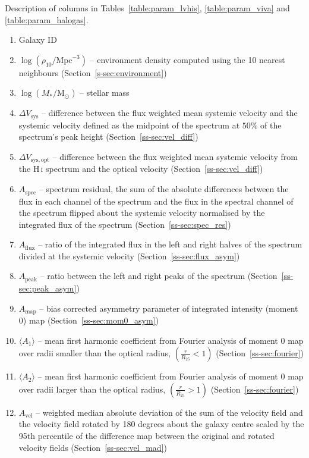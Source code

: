 \documentclass[fleqn,usenatbib]{mnras}
\begin{document}
Description of columns in Tables~\ref{table:param_lvhis}, \ref{table:param_viva} and \ref{table:param_halogas}.

\renewcommand{\labelenumi}{\arabic{enumi}}
\begin{enumerate}
    \item Galaxy ID
    \item $\log(\rho_{10}/\mathrm{Mpc}^{-3})$ -- environment density computed using the 10 nearest neighbours (Section~\ref{s-sec:environment})
    \item $\log\left(M_*/\mathrm{M}_{\mathrm{\odot}}\right)$ -- stellar mass
    \item $\Delta V_{\mathrm{sys}}$ -- difference between the flux weighted mean systemic velocity and the systemic velocity defined as the midpoint of the spectrum at $50\%$ of the spectrum's peak height (Section~\ref{ss-sec:vel_diff})
    \item $\Delta V_{\mathrm{sys,opt}}$ -- difference between the flux weighted mean systemic velocity from the H\,\textsc{i} spectrum and the optical velocity (Section~\ref{ss-sec:vel_diff})
    \item $A_{\mathrm{spec}}$ -- spectrum residual, the sum of the absolute differences between the flux in each channel of the spectrum and the flux in the spectral channel of the spectrum flipped about the systemic velocity normalised by the integrated flux of the spectrum (Section~\ref{ss-sec:spec_res})
    \item $A_{\mathrm{flux}}$ -- ratio of the integrated flux in the left and right halves of the spectrum divided at the systemic velocity (Section~\ref{ss-sec:flux_asym})
    \item $A_{\mathrm{peak}}$ -- ratio between the left and right peaks of the spectrum (Section~\ref{ss-sec:peak_asym})
    \item $A_{\mathrm{map}}$ -- bias corrected asymmetry parameter of integrated intensity (moment 0) map (Section~\ref{ss-sec:mom0_asym})
    \item $\langle A_{1}\rangle$ -- mean first harmonic coefficient from Fourier analysis of moment 0 map over radii smaller than the optical radius, $\left(\frac{r}{R_{25}}<1\right)$ (Section~\ref{ss-sec:fourier})
    \item $\langle A_{2}\rangle$ -- mean first harmonic coefficient from Fourier analysis of moment 0 map over radii larger than the optical radius, $\left(\frac{r}{R_{25}}>1\right)$ (Section~\ref{ss-sec:fourier})
    \item $A_{\mathrm{vel}}$ -- weighted median absolute deviation of the sum of the velocity field and the velocity field rotated by 180 degrees about the galaxy centre scaled by the 95th percentile of the difference map between the original and rotated velocity fields (Section~\ref{ss-sec:vel_mad})
\end{enumerate}
\end{document}
